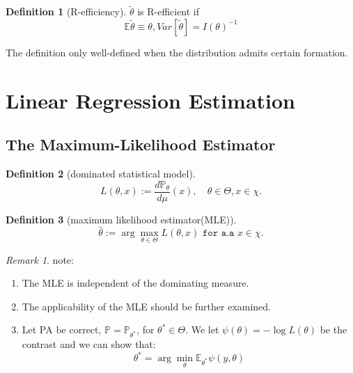 \documentclass[a4paper,12pt, oneside, fleqn]{book}
\theoremstyle{definition}
\newtheorem{definition}{Definition}[section]
\theoremstyle{remark}
\newtheorem*{remark}{Remark}
\begin{document}
\begin{definition}[R-efficiency]
	$\tilde{\theta}$ is R-efficient if
	\begin{equation*}
		\mathbb{E}\tilde{\theta} \equiv \theta, Var[\tilde{\theta}] = I(\theta)^{-1}
	\end{equation*} 

\end{definition}
The definition only well-defined when the distribution admits certain formation.






\newpage



\section{Linear Regression Estimation}
\subsection{The Maximum-Likelihood Estimator}
\begin{definition}[dominated statistical model]
\begin{equation}
	L(\theta, x):= \frac{d\mathbb{P}_\theta}{d\mu}(x), \quad \theta \in \Theta, x \in \chi. 
\end{equation}	
\end{definition}

\begin{definition}[maximum likelihood estimator(MLE)]
\begin{equation}
	\hat{\theta}  := \arg\max_{\theta \in \Theta} L(\theta, x) \texttt{ for a.a } x \in \chi. 
\end{equation}
\end{definition}

\begin{remark}
note:
\begin{enumerate}
    \item The MLE is independent of the dominating measure.
    \item The applicability of the MLE should be further examined.
    \item Let PA be correct, $\mathbb{P} = \mathbb{P}_{\theta^*}$, for $\theta^* \in \Theta$. We let $\psi(\theta) = -\log L(\theta)$ be the contrast and we can show that:
		\begin{equation*}
			\theta^* = \arg \min_\theta \mathbb{E}_{\theta^*} \psi(y, \theta) 
		\end{equation*}
\end{enumerate}
\end{remark}
\end{document}
